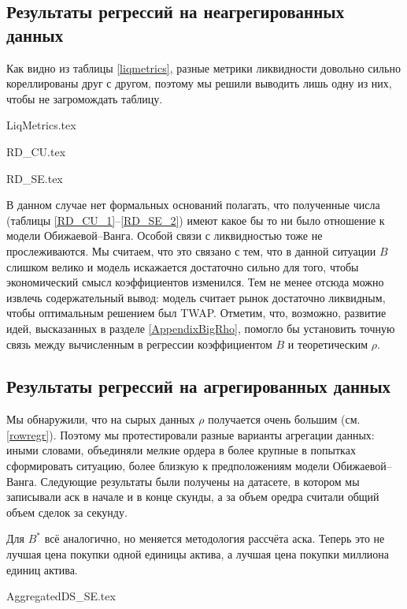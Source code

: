\subsection{Результаты регрессий на неагрегированных данных}
Как видно из таблицы \ref{liqmetrics}, разные метрики ликвидности довольно сильно кореллированы друг с другом, поэтому 
мы решили выводить лишь одну из них, чтобы не загромождать таблицу.
\par
{LiqMetrics.tex}

{RD_CU.tex}

{RD_SE.tex}


В данном случае нет формальных оснований полагать, что полученные числа 
(таблицы \ref{RD_CU_1}--\ref{RD_SE_2}) имеют какое бы то ни было отношение к модели 
Обижаевой--Ванга. Особой связи с ликвидностью тоже не прослеживаются. Мы считаем, что это связано с тем, 
что в данной ситуации $B$ слишком велико и модель искажается достаточно сильно для того, 
чтобы экономический смысл коэффициентов изменился. Тем не менее отсюда можно извлечь содержательный вывод:
модель считает рынок достаточно ликвидным, чтобы оптимальным решением был TWAP. 
Отметим, что, возможно, развитие идей, высказанных в разделе \ref{AppendixBigRho}, 
помогло бы установить точную связь между вычисленным в регрессии
коэффициентом $B$ и теоретическим $\rho$. 


\subsection{Результаты регрессий на агрегированных данных}
Мы обнаружили, что на сырых данных $\rho$ получается очень большим (см. \ref{rowregr}). Поэтому мы протестировали разные
варианты агрегации данных: иными словами, объединяли мелкие ордера в более крупные в попытках сформировать ситуацию,
более близкую к предположениям модели Обижаевой--Ванга. Следующие результаты были получены на датасете, в котором мы 
записывали аск в начале и в конце скунды, а за объем оредра считали общий объем сделок за секунду.
\par
Для $B ^*$ всё аналогично, но меняется методология рассчёта аска. Теперь это не лучшая цена покупки
одной единицы актива, а лучшая цена покупки миллиона единиц актива. 
\par

{AggregatedDS_SE.tex}

